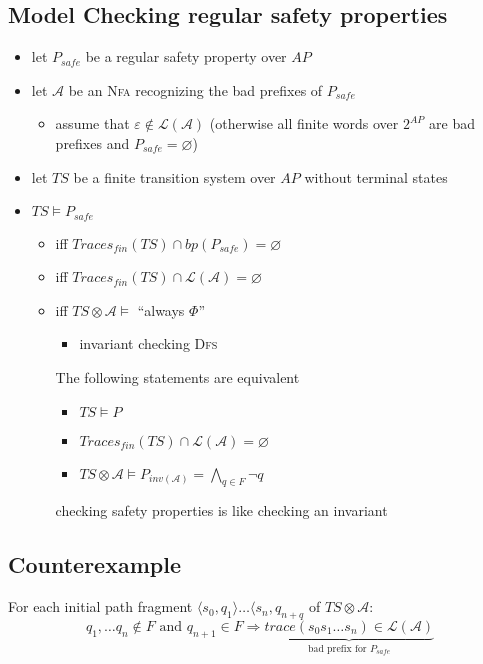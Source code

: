 \documentclass[a4paper, 10pt]{article}
\begin{document}
\subsection*{Model Checking regular safety properties}

\begin{itemize}
    \item let $P_{safe}$ be a regular safety property over $AP$
    \item let $\mathcal{A}$ be an \textsc{Nfa} recognizing the bad prefixes of $P_{safe}$
    \begin{itemize}
        \item assume that $\varepsilon\not\in\mathcal{L}(\mathcal{A})$ (otherwise all finite words over $2^{AP}$ are bad prefixes and $P_{safe}=\varnothing$)
    \end{itemize}
    \item let $TS$ be a finite transition system over $AP$ without terminal states
    \item $TS\models P_{safe}$
    \begin{itemize}
        \item iff $Traces_{fin}(TS)\cap bp(P_{safe})=\varnothing$
        \item iff $Traces_{fin}(TS)\cap \mathcal{L}(\mathcal{A})=\varnothing$
        \item iff $TS\otimes\mathcal{A}\models $ ``always $\Phi$''
        \begin{itemize}
            \item invariant checking \follows  \textsc{Dfs}
        \end{itemize}
        \begin{shaded}
            The following statements are equivalent
            \begin{itemize}
                \item $TS\models P$
                \item $Traces_{fin}(TS)\cap\mathcal{L}(\mathcal{A})=\varnothing$
                \item $TS\otimes\mathcal{A} \models P_{inv(\mathcal{A})}=\bigwedge_{q\in F} \neg q$
            \end{itemize}
            \follows checking safety properties is like checking an invariant
        \end{shaded}
    \end{itemize}
\end{itemize}

\subsection*{Counterexample}
\begin{shaded}
    For each initial path fragment $\langle s_0,q_1\rangle\dots\langle s_n,q_{n+q}$ of $TS\otimes\mathcal{A}:$
    \[
    q_1,\dots q_n\not\in F \textrm{ and } q_{n+1}\in F \Rightarrow \underset{\textrm{bad prefix for } P_{safe}}{\underbrace{trace(s_0s_1\dots s_n)\in\mathcal{L(\mathcal{A})}}}
    \]
\end{shaded}

\end{document}
